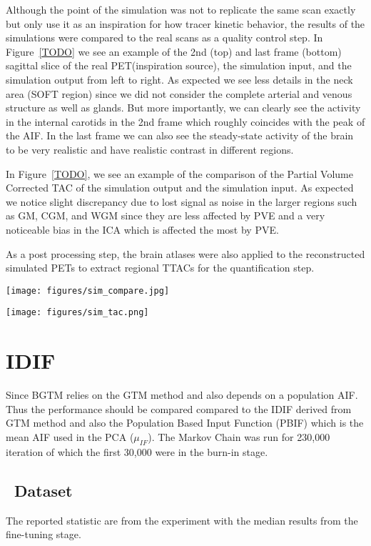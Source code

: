 Although the point of the simulation was not to replicate the same scan exactly but only use it as an inspiration for how tracer kinetic behavior, the results of the simulations were compared to the real scans as a quality control step.
In Figure~\ref{TODO} we see an example of the 2nd (top) and last frame (bottom) sagittal slice of the real PET(inspiration source), the simulation input, and the simulation output from left to right.
As expected we see less details in the neck area (SOFT region) since we did not consider the complete arterial and venous structure as well as glands.
But more importantly, we can clearly see the activity in the internal carotids in the 2nd frame which roughly coincides with the peak of the AIF.
In the last frame we can also see the steady-state activity of the brain to be very realistic and have realistic contrast in different regions.

In Figure~\ref{TODO}, we see an example of the comparison of the Partial Volume Corrected TAC of the simulation output and the simulation input.
As expected we notice slight discrepancy due to lost signal as noise in the larger regions such as GM, CGM, and WGM since they are less affected by PVE and a very noticeable bias in the ICA which is affected the most by PVE.

As a post processing step, the brain atlases were also applied to the reconstructed simulated PETs to extract regional TTACs for the quantification step.

\texttt{[image: figures/sim\_compare.jpg]}

\texttt{[image: figures/sim\_tac.png]}

\section{IDIF}

Since BGTM relies on the GTM method and also depends on a population AIF. Thus the performance should be compared compared to the IDIF derived from GTM method and also the Population Based Input Function (PBIF) which is the mean AIF used in the PCA (\(\mu_{IF}\)).
The Markov Chain was run for 230,000 iteration of which the first 30,000 were in the burn-in stage.

\subsection{\fdg\ Dataset}
The reported statistic are from the experiment with the median results from the fine-tuning stage.

